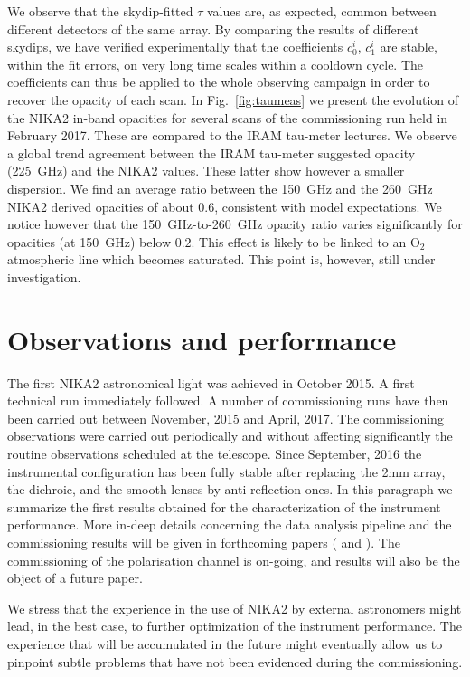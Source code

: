 \documentclass[]{aa} %
\begin{document}
We observe that the skydip-fitted $\tau$ values are, as expected, common between different detectors of the same array. By comparing the results of different skydips, we have verified experimentally that the coefficients $c^{i}_0$, $c^{i}_1$ are stable, within the fit errors, on very long time scales within a cooldown cycle. The coefficients can thus be applied to the whole observing campaign in order to recover the opacity of each scan. In Fig.~\ref{fig:taumeas} we present the evolution of the NIKA2 in-band opacities for several scans of the commissioning run held in February 2017. These are compared to the IRAM tau-meter lectures. We observe a global trend agreement between the IRAM tau-meter suggested opacity (225~GHz) and the NIKA2 values. These latter show however a smaller dispersion. We find an average ratio between the 150~GHz and the 260~GHz NIKA2 derived opacities of about 0.6, consistent with model expectations. We notice however that the 150~GHz-to-260~GHz opacity ratio varies significantly for opacities (at 150~GHz) below $0.2$. This effect is likely to be linked to an O$_2$ atmospheric line which becomes saturated. This point is, however, still under investigation.

\section{Observations and performance}
\label{Observations and performance}

The first NIKA2 astronomical light was achieved in October 2015. A first technical run immediately followed. A number of commissioning runs have then been carried out between November, 2015 and April, 2017. The commissioning observations were carried out periodically and without affecting significantly the routine observations scheduled at the telescope. Since September, 2016 the instrumental configuration has been fully stable after replacing the 2mm array, the dichroic, and the smooth lenses by anti-reflection ones.
In this paragraph we summarize the first results obtained for the characterization of the instrument performance. More in-deep details concerning the data analysis pipeline and the commissioning results will be given in forthcoming papers (\cite{pipeline} and \cite{commissioning}). The commissioning of the polarisation channel is on-going, and results will also be the object of a future paper. 

We stress that the experience in the use of NIKA2 by external astronomers might lead, in the best case, to further optimization of the instrument performance. The experience that will be accumulated in the future might eventually allow us to pinpoint subtle problems that have not been evidenced during the commissioning. 
\end{document}
